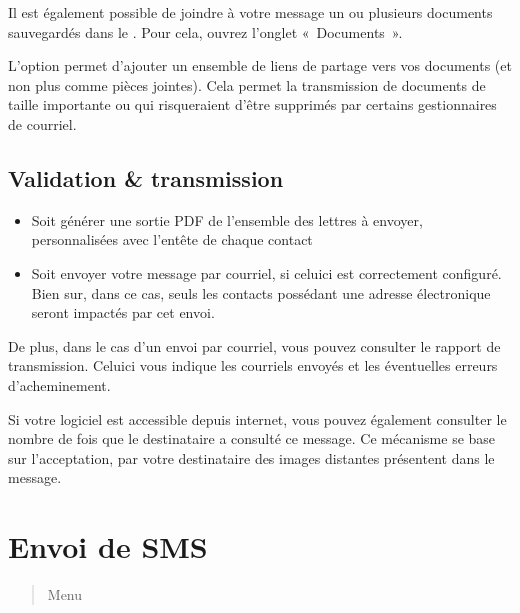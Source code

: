 \documentclass[letterpaper,10pt,french]{sphinxmanual}
\begin{document}
\sphinxAtStartPar
Il est également possible de joindre à votre message un ou plusieurs documents sauvegardés dans le . Pour cela, ouvrez l’onglet « Documents ».

\sphinxAtStartPar
L’option  permet d’ajouter un ensemble de liens de partage vers vos documents (et non plus comme pièces jointes). Cela permet la transmission de documents de taille importante ou qui risqueraient d’être supprimés par certains gestionnaires de courriel.


\subsection{Validation \& transmission}
\label{\detokenize{mailing/mailing:validation-transmission}}\begin{description}
\begin{itemize}
\item {} 
\sphinxAtStartPar
Soit générer une sortie PDF de l’ensemble des lettres à envoyer, personnalisées avec l’en\sphinxhyphen{}tête de chaque contact

\item {} 
\sphinxAtStartPar
Soit envoyer votre message par courriel, si celui\sphinxhyphen{}ci est correctement configuré. Bien sur, dans ce cas, seuls les contacts possédant une adresse électronique seront impactés par cet envoi.

\end{itemize}

\end{description}

\sphinxAtStartPar
De plus, dans le cas d’un envoi par courriel, vous pouvez consulter le rapport de transmission. Celui\sphinxhyphen{}ci vous indique les courriels envoyés et les éventuelles erreurs d’acheminement.

\sphinxAtStartPar
Si votre logiciel est accessible depuis internet, vous pouvez également consulter le nombre de fois que le destinataire a consulté ce message.
Ce mécanisme se base sur l’acceptation, par votre destinataire des images distantes présentent dans le message.

\sphinxstepscope


\section{Envoi de SMS}
\label{\detokenize{mailing/sms:envoi-de-sms}}\label{\detokenize{mailing/sms::doc}}\begin{quote}

\sphinxAtStartPar
Menu 
\end{quote}
\end{document}
